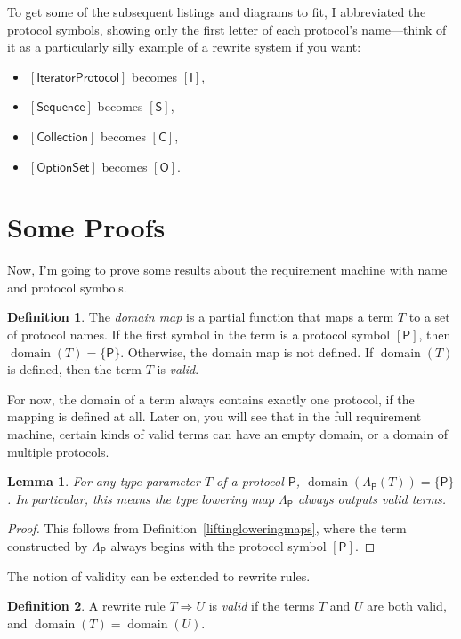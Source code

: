\documentclass[headsepline,bibliography=totoc]{scrreport}
\newcommand{\proto}[1]{\bm{\mathsf{#1}}}
\newcommand{\protosym}[1]{[\proto{#1}]}
\DeclareMathOperator{\domain}{domain}
\newtheorem{lemma}{Lemma}[chapter]
\theoremstyle{definition}
\theoremstyle{definition}
\newtheorem{definition}{Definition}[chapter]
\theoremstyle{definition}
\begin{document}

To get some of the subsequent listings and diagrams to fit, I abbreviated the protocol symbols, showing only the first letter of each protocol's name---think of it as a particularly silly example of a rewrite system if you want:
\begin{itemize}
\item $\protosym{IteratorProtocol}$ becomes $\protosym{I}$, 
\item $\protosym{Sequence}$ becomes $\protosym{S}$, 
\item $\protosym{Collection}$ becomes $\protosym{C}$,
\item $\protosym{OptionSet}$ becomes $\protosym{O}$.
\end{itemize}

\section{Some Proofs}
Now, I'm going to prove some results about the requirement machine with name and protocol symbols.

\begin{definition}\label{domain1} The \emph{domain map} is a partial function that maps a term $T$ to a set of protocol names. If the first symbol in the term is a protocol symbol $\protosym{P}$, then $\domain(T)=\{\proto{P}\}$. Otherwise, the domain map is not defined. If $\domain(T)$ is defined, then the term $T$ is \emph{valid}.

For now, the domain of a term always contains exactly one protocol, if the mapping is defined at all. Later on, you will see that in the full requirement machine, certain kinds of valid terms can have an empty domain, or a domain of multiple protocols.
\end{definition}
\begin{lemma}\label{domainoflowered} For any type parameter $T$ of a protocol $\proto{P}$, $\domain(\Lambda_{\proto{P}}(T))=\{\proto{P}\}$. In particular, this means the type lowering map $\Lambda_{\proto{P}}$ always outputs valid terms.
\end{lemma}
\begin{proof}
This follows from Definition~\ref{liftingloweringmaps}, where the term constructed by $\Lambda_{\proto{P}}$ always begins with the protocol symbol $\protosym{P}$.
\end{proof}
The notion of validity can be extended to rewrite rules.
\begin{definition}\label{validrule}
A rewrite rule $T\Rightarrow U$ is \emph{valid} if the terms $T$ and $U$ are both valid, and $\domain(T)=\domain(U)$.
\end{definition}
\end{document}
